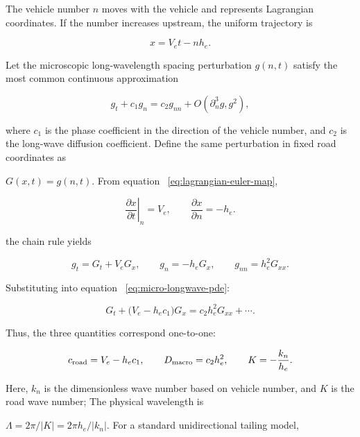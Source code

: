 \documentclass[11pt,a4paper,openany]{book}
\numberwithin{equation}{chapter}
\numberwithin{figure}{chapter}
\numberwithin{table}{chapter}
\begin{document}
The vehicle number $n$ moves with the vehicle and represents Lagrangian coordinates. If the number increases upstream, the uniform trajectory is

\begin{equation}
x=V_et-nh_e.
\label{eq:lagrangian-euler-map}
\end{equation}

Let the microscopic long-wavelength spacing perturbation $g(n,t)$ satisfy the most common continuous approximation

\begin{equation}
g_t+c_1g_n=c_2g_{nn}+O(\partial_n^3g,g^2),
\label{eq:micro-longwave-pde}
\end{equation}

where $c_1$ is the phase coefficient in the direction of the vehicle number, and $c_2$ is the long-wave diffusion coefficient. Define the same perturbation in fixed road coordinates as

$G(x,t)=g(n,t)$. From equation ~\eqref{eq:lagrangian-euler-map},

\begin{equation}
\left.\frac{\partial x}{\partial t}\right|_n=V_e,
\qquad
\frac{\partial x}{\partial n}=-h_e.
\end{equation}

the chain rule yields

\begin{equation}
g_t=G_t+V_eG_x,\qquad
g_n=-h_eG_x,\qquad
g_{nn}=h_e^2G_{xx}.
\label{eq:derivative-map-micro-macro}
\end{equation}

Substituting into equation ~\eqref{eq:micro-longwave-pde}:

\begin{equation}
\boxed{
G_t+\bigl(V_e-h_ec_1\bigr)G_x
=c_2h_e^2G_{xx}+\cdots .}
\label{eq:eulerian-longwave-pde}
\end{equation}

Thus, the three quantities correspond one-to-one:

\begin{equation}
c_{\rm road}=V_e-h_ec_1,\qquad
D_{\rm macro}=c_2h_e^2,\qquad
K=-\frac{k_n}{h_e}.
\label{eq:micro-macro-coefficient-map}
\end{equation}

Here, $k_n$ is the dimensionless wave number based on vehicle number, and $K$ is the road wave number; The physical wavelength is

$\Lambda=2\pi/|K|=2\pi h_e/|k_n|$. For a standard unidirectional tailing model,
\end{document}
